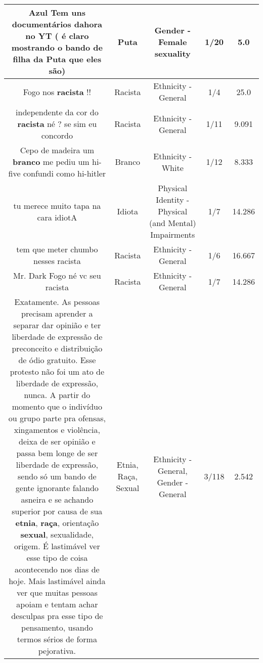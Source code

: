 \documentclass[11pt]{article}
\newlength\mylength
\begin{document}
\begin{center}
\begin{longtable}{|C{.65\mylength}|C{.30\mylength}|C{.12\mylength}|C{.12\mylength}|C{.12\mylength}|}
  \small Azul Tem uns documentários dahora no YT ( é claro mostrando o bando de filha da \textbf{Puta} que eles são)\normalsize   & Puta & Gender - Female sexuality & 1/20 & 5.0 \\  \hline
  \small Fogo nos \textbf{racista} !!\normalsize   & Racista & Ethnicity - General & 1/4 & 25.0 \\  \hline
  \small independente da cor do \textbf{racista} né ? se sim eu concordo\normalsize   & Racista & Ethnicity - General & 1/11 & 9.091 \\  \hline
  \small Cepo de madeira um \textbf{branco} me pediu um hi-five confundi como hi-hitler\normalsize   & Branco & Ethnicity - White & 1/12 & 8.333 \\  \hline
  \small tu merece muito tapa na cara  idiotA\normalsize   & Idiota & Physical Identity - Physical (and Mental) Impairments & 1/7 & 14.286 \\  \hline
  \small tem que meter chumbo nesses racista\normalsize   & Racista & Ethnicity - General & 1/6 & 16.667 \\  \hline
  \small Mr. Dark Fogo né vc seu racista\normalsize   & Racista & Ethnicity - General & 1/7 & 14.286 \\  \hline
  \small Exatamente. As pessoas precisam aprender a separar dar opinião e ter liberdade de expressão de preconceito e distribuição de ódio gratuito. Esse protesto não foi um ato de liberdade de expressão, nunca. A partir do momento que o indivíduo ou grupo parte pra ofensas, xingamentos e violência, deixa de ser opinião e passa bem longe de ser liberdade de expressão, sendo só um bando de gente ignorante falando asneira e se achando superior por causa de sua \textbf{etnia}, \textbf{raça}, orientação \textbf{sexual}, sexualidade, origem. É lastimável ver esse tipo de coisa acontecendo nos dias de hoje. Mais lastimável ainda ver que muitas pessoas apoiam e tentam achar desculpas pra esse tipo de pensamento, usando termos sérios de forma pejorativa.\normalsize   & Etnia, Raça, Sexual & Ethnicity - General, Gender - General & 3/118 & 2.542 \\  \hline

\end{longtable}
\end{center}
\end{document}
